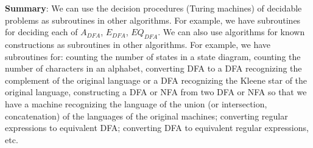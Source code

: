 \documentclass[12pt, oneside]{article}
\begin{document}
    
      {\bf Summary}:  We can use the decision procedures (Turing machines) of decidable problems
      as subroutines in other algorithms. For example, we have subroutines for deciding each of 
      $A_{DFA}$, $E_{DFA}$, $EQ_{DFA}$.  We can also use algorithms for known constructions
      as subroutines in other algorithms. For example, we have subroutines for: counting the number 
      of states in a state diagram, counting the number of characters in an alphabet, converting DFA
      to a DFA recognizing the complement of the original language or a DFA recognizing the 
      Kleene star of the original language, constructing a DFA or NFA from two DFA or NFA so that 
      we have a machine recognizing the language of the union (or intersection, concatenation)
      of the languages of the original machines; converting regular expressions to equivalent DFA; 
      converting DFA to equivalent regular expressions, etc.
     \vfill
\end{document}
